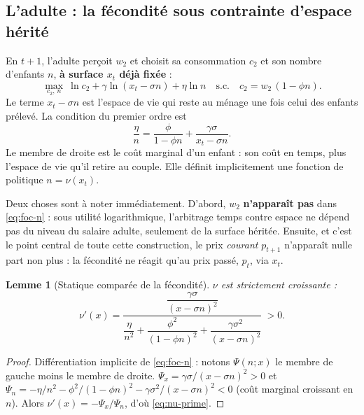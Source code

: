 \documentclass[11pt,a4paper]{article}
\theoremstyle{plain}
\newtheorem{lemme}{Lemme}
\theoremstyle{definition}
\begin{document}
\subsection{L'adulte : la fécondité sous contrainte d'espace hérité}

En $t+1$, l'adulte perçoit $w_2$ et choisit sa consommation $c_2$ et son nombre d'enfants $n$, \textbf{à surface $x_t$ déjà fixée} :
\begin{equation}\label{eq:P2}
\max_{c_2,\,n} \ \ln c_2 + \gamma \ln (x_t - \sigma n) + \eta \ln n
\quad \text{s.c.} \quad c_2 = w_2\,(1-\phi n) .
\end{equation}
Le terme $x_t - \sigma n$ est l'espace de vie qui reste au ménage une fois celui des enfants prélevé. La condition du premier ordre est
\begin{equation}\label{eq:foc-n}
\frac{\eta}{n} = \frac{\phi}{1-\phi n} + \frac{\gamma \sigma}{x_t - \sigma n} .
\end{equation}
Le membre de droite est le coût marginal d'un enfant : son coût en temps, plus l'espace de vie qu'il retire au couple. Elle définit implicitement une fonction de politique $n = \nu(x_t)$.

Deux choses sont à noter immédiatement. D'abord, $w_2$ \textbf{n'apparaît pas} dans \eqref{eq:foc-n} : sous utilité logarithmique, l'arbitrage temps contre espace ne dépend pas du niveau du salaire adulte, seulement de la surface héritée. Ensuite, et c'est le point central de toute cette construction, le prix \emph{courant} $p_{t+1}$ n'apparaît nulle part non plus : la fécondité ne réagit qu'au prix passé, $p_t$, via $x_t$.

\begin{lemme}[Statique comparée de la fécondité]\label{lem:comp-stat}
$\nu$ est strictement croissante :
\begin{equation}\label{eq:nu-prime}
\nu'(x) = \frac{\dfrac{\gamma\sigma}{(x-\sigma n)^2}}{\dfrac{\eta}{n^2} + \dfrac{\phi^2}{(1-\phi n)^2} + \dfrac{\gamma\sigma^2}{(x-\sigma n)^2}} \ > 0 .
\end{equation}
\end{lemme}
\begin{proof}
Différentiation implicite de \eqref{eq:foc-n} : notons $\Psi(n;x)$ le membre de gauche moins le membre de droite. $\Psi_x = \gamma\sigma/(x-\sigma n)^2 > 0$ et $\Psi_n = -\eta/n^2 - \phi^2/(1-\phi n)^2 - \gamma\sigma^2/(x-\sigma n)^2 < 0$ (coût marginal croissant en $n$). Alors $\nu'(x) = -\Psi_x/\Psi_n$, d'où \eqref{eq:nu-prime}.
\end{proof}
\end{document}
